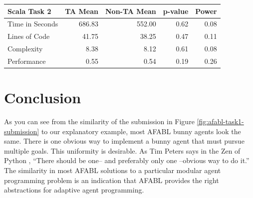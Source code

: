 \begin{center}
\begin{table}[h]
\begin{center}
\begin{tabular}{|l|r|r|r|r|}\hline
Scala Task 2 & TA Mean & Non-TA Mean & p-value & Power\\\hline
Time in Seconds & 686.83 & 552.00 & 0.62 & 0.08\\
Lines of Code & 41.75 & 38.25 & 0.47 & 0.11\\
Complexity & 8.38 & 8.12 & 0.61 & 0.08\\
Performance & 0.55 & 0.54 & 0.19 & 0.26\\
\hline
\end{tabular}

\end{center}
\label{tbl:tas-vs-non-tas}
\end{table}
\end{center}


\section{Conclusion}

As you can see from the similarity of the submission in Figure \ref{fig:afabl-task1-submission} to our explanatory example, most AFABL bunny agents look the same. There is one obvious way to implement a bunny agent that must pursue multiple goals. This uniformity is desirable. As Tim Peters says in the Zen of Python \cite{peters2004zen}, ``There should be one-- and preferably only one --obvious way to do it.'' The similarity in most AFABL solutions to a particular modular agent programming problem is an indication that AFABL provides the right abstractions for adaptive agent programming. 
